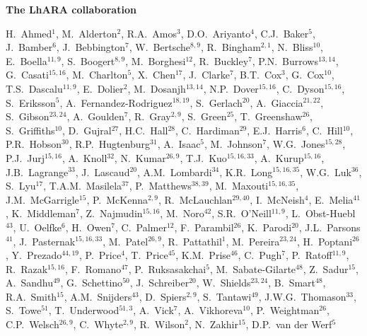 \vspace{0.75cm}
\begin{center}
  {\bf \color{BlueViolet} The LhARA collaboration} \\
  \vspace{0.25cm}
\end{center}
\begin{center}
  H.~Ahmed$^{1}$,
  M.~Alderton$^{2}$,
  R.A.~Amos$^{3}$,
  D.O.~Ariyanto$^{4}$,
  C.J.~Baker$^{5}$,
  J.~Bamber$^{6}$,
  J.~Bebbington$^{7}$,
  W.~Bertsche$^{8,9}$,
  R.~Bingham$^{2,1}$,
  N.~Bliss$^{10}$,
  E.~Boella$^{11,9}$,
  S.~Boogert$^{8,9}$,
  M.~Borghesi$^{12}$,
  R.~Buckley$^{7}$,
  P.N.~Burrows$^{13,14}$,
  G.~Casati$^{15,16}$,
  M.~Charlton$^{5}$,
  X.~Chen$^{17}$,
  J.~Clarke$^{7}$,
  B.T.~Cox$^{3}$,
  G.~Cox$^{10}$,
  T.S.~Dascalu$^{11,9}$,
  E.~Dolier$^{2}$,
  M.~Dosanjh$^{13,14}$,
  N.P.~Dover$^{15,16}$,
  C.~Dyson$^{15,16}$,
  S.~Eriksson$^{5}$,
  A.~Fernandez-Rodriguez$^{18,19}$,
  S.~Gerlach$^{20}$,
  A.~Giaccia$^{21,22}$,
  S.~Gibson$^{23,24}$,
  A.~Goulden$^{7}$,
  R.~Gray$^{2,9}$,
  S.~Green$^{25}$,
  T.~Greenshaw$^{26}$,
  S.~Griffiths$^{10}$,
  D.~Gujral$^{27}$,
  H.C.~Hall$^{28}$,
  C.~Hardiman$^{29}$,
  E.J.~Harris$^{6}$,
  C.~Hill$^{10}$,
  P.R.~Hobson$^{30}$,
  R.P.~Hugtenburg$^{31}$,
  A.~Isaac$^{5}$,
  M.~Johnson$^{7}$,
  W.G.~Jones$^{15,28}$,
  P.J.~Jurj$^{15,16}$,
  A.~Knoll$^{32}$,
  N.~Kumar$^{26,9}$,
  T.J.~Kuo$^{15,16,33}$,
  A.~Kurup$^{15,16}$,
  J.B.~Lagrange$^{33}$,
  J.~Lascaud$^{20}$,
  A.M.~Lombardi$^{34}$,
  K.R.~Long$^{15,16,35}$,
  W.G.~Luk$^{36}$,
  S.~Lyu$^{17}$,
  T.A.M.~Masilela$^{37}$,
  P.~Matthews$^{38,39}$,
  M.~Maxouti$^{15,16,35}$,
  J.M.~McGarrigle$^{15}$,
  P.~McKenna$^{2,9}$,
  R.~McLauchlan$^{29,40}$,
  I.~McNeish$^{4}$,
  E.~Melia$^{41}$,
  K.~Middleman$^{7}$,
  Z.~Najmudin$^{15,16}$,
  M.~Noro$^{42}$,
  S.R.~O'Neill$^{11,9}$,
  L.~Obst-Huebl$^{43}$,
  U.~Oelfke$^{6}$,
  H.~Owen$^{7}$,
  C.~Palmer$^{12}$,
  F.~Parambil$^{26}$,
  K.~Parodi$^{20}$,
  J.L.~Parsons$^{41}$,
  J.~Pasternak$^{15,16,33}$,
  M.~Patel$^{26,9}$,
  R.~Pattathil$^{1}$,
  M.~Pereira$^{23,24}$,
  H.~Poptani$^{26}$,
  Y.~Prezado$^{44,19}$,
  P.~Price$^{4}$,
  T.~Price$^{45}$,
  K.M.~Prise$^{46}$,
  C.~Pugh$^{7}$,
  P.~Ratoff$^{11,9}$,
  R.~Razak$^{15,16}$,
  F.~Romano$^{47}$,
  P.~Ruksasakchai$^{5}$,
  M.~Sabate-Gilarte$^{48}$,
  Z.~Sadur$^{15}$,
  A.~Sandhu$^{49}$,
  G.~Schettino$^{50}$,
  J.~Schreiber$^{20}$,
  W.~Shields$^{23,24}$,
  B.~Smart$^{48}$,
  R.A.~Smith$^{15}$,
  A.M.~Snijders$^{43}$,
  D.~Spiers$^{2,9}$,
  S.~Tantawi$^{49}$,
  J.W.G.~Thomason$^{33}$,
  S.~Towe$^{51}$,
  T.~Underwood$^{51,3}$,
  A.~Vick$^{7}$,
  A.~Vikhoreva$^{10}$,
  P.~Weightman$^{26}$,
  C.P.~Welsch$^{26,9}$,
  C.~Whyte$^{2,9}$,
  R.~Wilson$^{2}$,
  N.~Zakhir$^{15}$,
  D.P.~van der Werf$^{5}$
\end{center}
